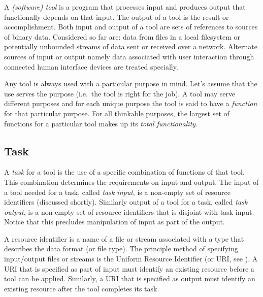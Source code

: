 \documentclass{article}
\begin{document}
   A \textit{(software) tool} is a program that processes input and produces
   output that functionally depends on that input. The output of a tool is the
   result or accomplishment. Both input and output of a tool are sets of
   references to sources of binary data. Considered so far are: data from files
   in a local filesystem or potentially unbounded streams of data sent or received
   over a network. Alternate sources of input or output namely data associated
   with user interaction through connected human interface devices are treated
   specially.
   
   Any tool is always used with a particular purpose in mind. Let's assume that
   the use serves the purpose (i.e.\ the tool is right for the job). A tool may
   serve different purposes and for each unique purpose the tool is said to
   have a \emph{function} for that particular purpose. For all thinkable
   purposes, the largest set of functions for a particular tool makes up its
   \textit{total functionality}.


  \subsection{Task}

   A \textit{task} for a tool is the use of a specific combination of functions
   of that tool. This combination determines the requirements on input and
   output. The input of a tool needed for a task, called \textit{task input},
   is a non-empty set of resource identifiers (discussed shortly). Similarly
   output of a tool for a task, called \textit{task output}, is a non-empty set
   of resource identifiers that is disjoint with task input. Notice that this
   precludes manipulation of input as part of the output. 

   A resource identifier is a name of a file or stream associated with a type
   that describes the data format (or file type).  The principle method of
   specifying input/output files or streams is the Uniform Resource Identifier
   (or URI, see \cite{rfc3305}). A URI that is specified as part of input must
   identify an existing resource before a tool can be applied. Similarly, a URI
   that is specified as output must identify an existing resource after the
   tool completes its task.
\end{document}
